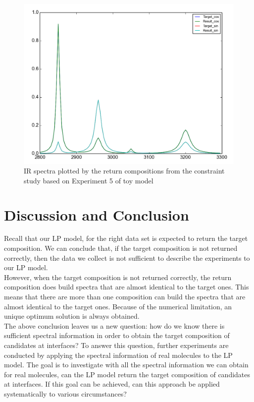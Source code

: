\begin{figure}[!ht] 
\centering
\includegraphics[scale=0.3]{Figures/toy_model_result_plotting_ir_sin_10candi_constraint_study_experiment5.png} 
\caption{IR spectra plotted by the return compositions from the constraint study based on Experiment 5 of toy model}\label{fig:3.6}
\end{figure}

\section{Discussion and Conclusion}

Recall that our LP model, for the right data set is expected to return the target composition. We can conclude that, if the target composition is not returned correctly, then the data we collect is not sufficient to describe the experiments to our LP model. \\

However, when the target composition is not returned correctly, the return composition does build spectra that are almost identical to the target ones. This means that there are more than one composition can build the spectra that are almost identical to the target ones. Because of the numerical limitation, an unique optimum solution is always obtained. \\

The above conclusion leaves us a new question: how do we know there is sufficient spectral information in order to obtain the target composition of candidates at interfaces? To answer this question, further experiments are conducted by applying the spectral information of real molecules to the LP model. The goal is to investigate with all the spectral information we can obtain for real molecules, can the LP model return the target composition of candidates at interfaces. If this goal can be achieved, can this approach be applied systematically to various circumstances?

